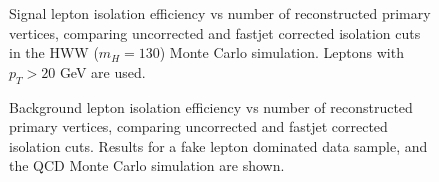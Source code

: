 \begin{figure}[!htbp]
\begin{center}
\caption{Signal lepton isolation efficiency vs number of reconstructed primary vertices, comparing uncorrected 
and fastjet corrected isolation cuts in the HWW ($m_{H} = 130$) Monte Carlo simulation. Leptons
with $p_{T} > 20$ GeV are used.}
\label{fig:HWW130IsoEff_vs_NVertices_FastjetCorrection}
\end{center}
\end{figure}

\begin{figure}[!htbp]
\begin{center}
\caption{Background lepton isolation efficiency vs number of reconstructed primary vertices, comparing uncorrected 
and fastjet corrected isolation cuts. Results for a fake lepton dominated data sample, and the QCD Monte Carlo simulation
are shown. }
\label{fig:BkgIsoEff_vs_NVertices_FastjetCorrection}
\end{center}
\end{figure}

